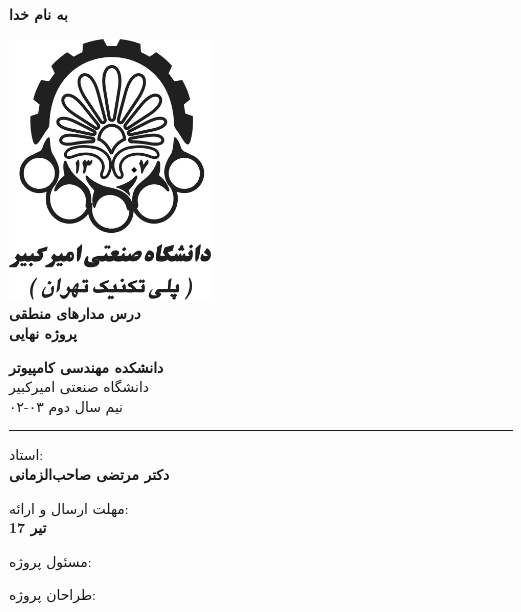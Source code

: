 \documentclass[]{article}
\begin{document}
\begin{titlepage}
\begin{center}

\textbf{ \Huge{به نام خدا} }
        
\vspace{0.2cm}

\includegraphics[width=0.4\textwidth]{Logo/aut-fa2.png}\\
\vspace{0.2cm}
\textbf{ \Huge{\emph درس مدار‌های منطقی} }\\
\vspace{0.25cm}
\textbf{ \Large{ پروژه نهایی} }
\vspace{0.2cm}
       
 
      \large \textbf{دانشکده مهندسی کامپیوتر}\\\vspace{0.1cm}
    \large   دانشگاه صنعتی امیرکبیر\\\vspace{0.2cm}
       \large   ﻧﯿﻢ سال دوم ۰۳-۰۲ \\\vspace{0.10cm}
      \noindent\rule[1ex]{\linewidth}{1pt}
استاد:\\
    \textbf{{دکتر مرتضی صاحب‌الزمانی}}



    \vspace{0.20cm}

   مهلت ارسال و ارائه:\\
    \textbf{{17 تیر}}

    \vspace{0.10cm}
مسئول پروژه:\\
    \textbf{}
    
        \vspace{0.10cm}
طراحان پروژه:\\
    \textbf{}
    

\end{center}
\end{titlepage}
\end{document}
